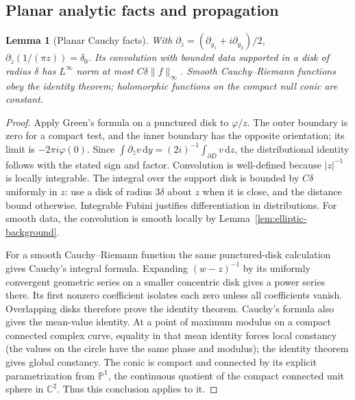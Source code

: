 \documentclass[11pt]{article}
\newcommand{\C}{\mathbb C}
\newcommand{\dd}{\mathrm d}
\newtheorem{lemma}[theorem]{Lemma}
\theoremstyle{remark}
\numberwithin{equation}{section}
\begin{document}
\subsection{Planar analytic facts and propagation}

\begin{lemma}[Planar Cauchy facts]\label{lem:cauchy-background}
With $\partial_{\bar z}=(\partial_{y_1}+i\partial_{y_2})/2$,
$\partial_{\bar z}(1/(\pi z))=\delta_0$. Its convolution with bounded
data supported in a disk of radius $\delta$ has $L^\infty$ norm at most
$C\delta\|f\|_\infty$. Smooth Cauchy--Riemann functions obey the
identity theorem; holomorphic functions on the compact null conic are
constant.
\end{lemma}
\begin{proof}
Apply Green's formula on a punctured disk to $\varphi/z$. The outer
boundary is zero for a compact test, and the inner boundary has the
opposite orientation; its limit is $-2\pi i\varphi(0)$. Since
$\int\partial_{\bar z}v\,\dd y=(2i)^{-1}\int_{\partial D}v\,\dd z$,
the distributional identity follows with the stated sign and factor.
Convolution is well-defined because $|z|^{-1}$ is locally integrable.
The integral over the support disk is bounded by $C\delta$ uniformly in
$z$: use a disk of radius $3\delta$ about $z$ when it is close, and the
distance bound otherwise. Integrable Fubini justifies differentiation in
distributions. For smooth data, the convolution is smooth locally by
Lemma~\ref{lem:elliptic-background}.

For a smooth Cauchy--Riemann function the same punctured-disk calculation
gives Cauchy's integral formula. Expanding $(w-z)^{-1}$ by its uniformly
convergent geometric series on a smaller concentric disk gives a power
series there. Its first nonzero coefficient isolates each zero unless
all coefficients vanish. Overlapping disks therefore prove the identity
theorem. Cauchy's formula also gives the mean-value identity. At a point
of maximum modulus on a compact connected complex curve, equality in
that mean identity forces local constancy (the values on the circle
have the same phase and modulus); the identity theorem gives global
constancy. The conic is compact and connected by its explicit
parametrization from $\mathbb P^1$, the continuous quotient of the compact
connected unit sphere in $\C^2$. Thus this conclusion applies to it.
\end{proof}
\end{document}

